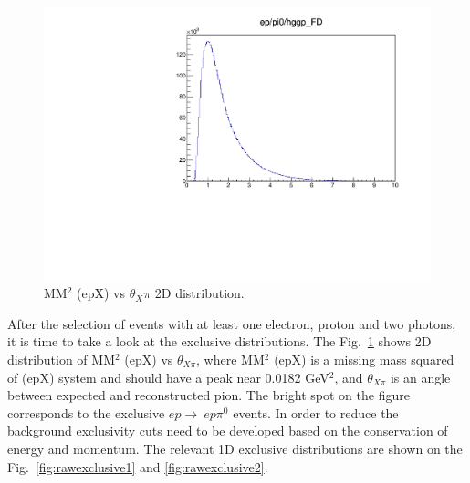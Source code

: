 \iffalse
\begin{figure}
	\vspace*{-0.3cm}
	\includegraphics[page=10,width=0.97\linewidth]{figures/eppi0.exclusive.pdf}
	\caption{MM$^2$ (epX) vs $\theta_X\pi$ 2D distribution.}
	\label{fig:MM2vsThetaXPi}
\end{figure}
After the selection of events with at least one electron, proton and two photons, it is time to take a look at the exclusive distributions.
The Fig.~\ref{fig:MM2vsThetaXPi} shows 2D distribution of MM$^2$ (epX) vs $\theta_{X\pi}$, where MM$^2$ (epX) is a missing mass squared of (epX) system and should have a peak near 0.0182 GeV$^2$, and $\theta_{X\pi}$ is an angle between expected and reconstructed pion.
The bright spot on the figure corresponds to the exclusive $ep\rightarrow~ep\pi^0$ events.
In order to reduce the background exclusivity cuts  need to be developed based on the conservation of energy and momentum.
The relevant 1D exclusive distributions are shown on the Fig.~\ref{fig:rawexclusive1} and \ref{fig:rawexclusive2}.

